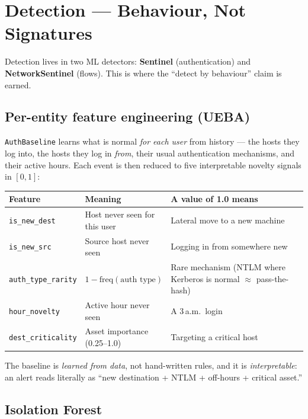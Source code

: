 \documentclass[11pt,a4paper]{article}
\begin{document}
\section{Detection — Behaviour, Not Signatures}

Detection lives in two ML detectors: \textbf{Sentinel} (authentication) and
\textbf{NetworkSentinel} (flows). This is where the ``detect by behaviour'' claim is earned.

\subsection{Per-entity feature engineering (UEBA)}

\texttt{AuthBaseline} learns what is normal \emph{for each user} from history — the hosts they
log into, the hosts they log in \emph{from}, their usual authentication mechanisms, and their
active hours. Each event is then reduced to five interpretable novelty signals in $[0,1]$:

\begin{center}
\begin{tabularx}{\linewidth}{@{}L{3.2cm} Y L{4.4cm}@{}}
\toprule
\textbf{Feature} & \textbf{Meaning} & \textbf{A value of 1.0 means} \\
\midrule
\texttt{is\_new\_dest}      & Host never seen for this user & Lateral move to a new machine \\
\texttt{is\_new\_src}       & Source host never seen        & Logging in from somewhere new \\
\texttt{auth\_type\_rarity} & $1-\text{freq}(\text{auth type})$ & Rare mechanism (NTLM where Kerberos is normal $\approx$ pass-the-hash) \\
\texttt{hour\_novelty}      & Active hour never seen        & A 3\,a.m.\ login \\
\texttt{dest\_criticality}  & Asset importance (0.25–1.0)   & Targeting a critical host \\
\bottomrule
\end{tabularx}
\end{center}

The baseline is \emph{learned from data}, not hand-written rules, and it is
\emph{interpretable}: an alert reads literally as ``new destination + NTLM + off-hours +
critical asset.''

\subsection{Isolation Forest}
\end{document}
